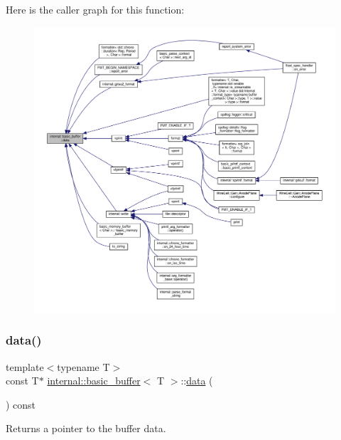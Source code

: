Here is the caller graph for this function\+:
\nopagebreak
\begin{figure}[H]
\begin{center}
\leavevmode
\includegraphics[width=350pt]{classinternal_1_1basic__buffer_ab4a96d7d4394f469568d290fde5a75a7_icgraph}
\end{center}
\end{figure}
\mbox{\label{classinternal_1_1basic__buffer_affc95a67bf8b10b2dba4bfd976c9901c}} 
\subsubsection{\texorpdfstring{data()}{data()}\hspace{0.1cm}{\footnotesize\ttfamily [2/2]}}
{\footnotesize\ttfamily template$<$typename T$>$ \\
const T$\ast$ \hyperlink{classinternal_1_1basic__buffer}{internal\+::basic\+\_\+buffer}$<$ T $>$\+::\hyperlink{namespaceinternal_adc3036f1841136e36e29e5fd339de1a1}{data} (\begin{DoxyParamCaption}{ }\end{DoxyParamCaption}) const\hspace{0.3cm}{\ttfamily [inline]}}

Returns a pointer to the buffer data. 

